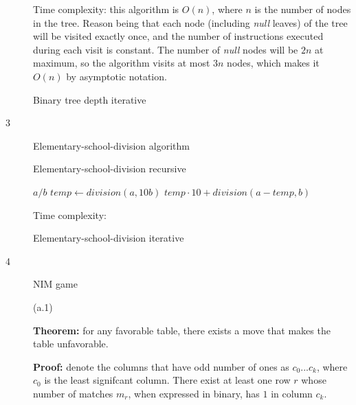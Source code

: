 \documentclass{article}
\begin{document}
\begin{description}
  Time complexity: this algorithm is $O(n)$, where $n$ is the number of nodes in the tree. Reason being that each node (including \textit{null} leaves) of the tree will be visited exactly once, and the number of instructions executed during each visit is constant. The number of \textit{null} nodes will be $2n$ at maximum, so the algorithm visits at most $3n$ nodes, which makes it $O(n)$ by asymptotic notation.

  \begin{algorithm}
  \caption{Binary tree depth iterative}
    \begin{algorithmic}[1]
      
    \EndFunction
    \end{algorithmic}
  \end{algorithm}

\item[3]{Elementary-school-division algorithm}

  \begin{algorithm}
  \caption{Elementary-school-division recursive}
    \begin{algorithmic}[1]
        \State \Return $a/b$
      \Else {} 
        \State $temp \gets division(a, 10b)$
        \State \Return $temp \cdot 10 + division(a - temp, b)$
      \EndIf
    \EndFunction
    \end{algorithmic}
  \end{algorithm}

  Time complexity: 

  \begin{algorithm}
  \caption{Elementary-school-division iterative}
    \begin{algorithmic}[1]
      
    \EndFunction
    \end{algorithmic}
  \end{algorithm}

\item[4]{NIM game}

  (a.1) 

  \textbf{Theorem:} for any favorable table, there exists a move that makes the table unfavorable.

  \textbf{Proof:} denote the columns that have odd number of ones as $c_0...c_k$, where $c_0$ is the least signifcant column. There exist at least one row $r$ whose number of matches $m_r$, when expressed in binary, has $1$ in column $c_k$.


\end{description}
\end{document}
